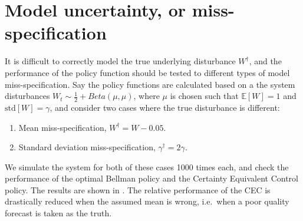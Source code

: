 \documentclass[main.tex]{subfiles}
\begin{document}



\listoftodos

\section{Model uncertainty, or miss-specification}\label{sec:markdown_miss_specification}
It is difficult to correctly model the true underlying disturbance
$W^\dagger$, and the performance of the policy function should be
tested to different types of model miss-specification.
Say the policy functions are calculated based on
a the system disturbances $W_t\sim \frac{1}{2}+Beta(\mu,\mu)$, where
$\mu$ is chosen such that $\mathbb E[W]=1$ and $\mbox{std}[W]=\gamma$,
and consider two cases where the true disturbance is different:
\begin{enumerate}
\item Mean miss-specification, $W^\dagger = W-0.05$.
\item Standard deviation miss-specification, $\gamma^\dagger = 2\gamma$.
\end{enumerate}
We simulate the system for both of these cases 1000 times each,
and check the performance of the optimal Bellman policy and the
Certainty Equivalent Control policy. The results are shown in
.
The relative performance of the CEC is drastically reduced when the
assumed mean is wrong, i.e.\ when a poor quality forecast is taken as
the truth.
\end{document}
